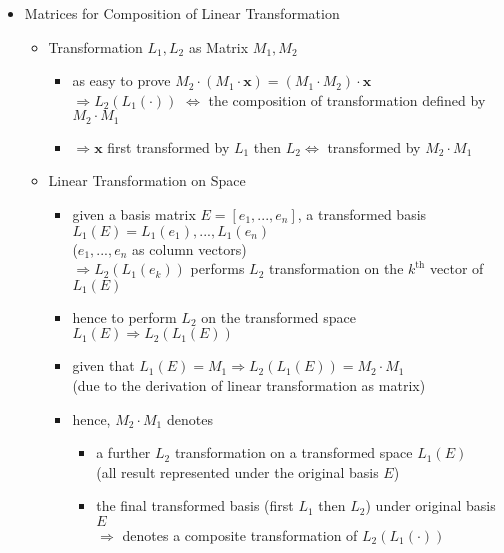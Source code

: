 \begin{itemize}
\item Matrices for Composition of Linear Transformation
	\begin{itemize}
	\item Transformation $L_1, L_2$ as Matrix $M_1, M_2$
		\begin{itemize}
		\item as easy to prove $M_2\cdot (M_1 \cdot \mathbf x) = (M_1\cdot M_2) \cdot \mathbf x$ \\
		$\Rightarrow L_2(L_1(\cdot))$ $\Leftrightarrow$ the composition of transformation defined by $M_2\cdot M_1$
		\item $\Rightarrow \mathbf x$ first transformed by $L_1$ then $L_2 \Leftrightarrow$ transformed by $M_2\cdot M_1$ 
		\end{itemize}
	\item Linear Transformation on Space
		\begin{itemize}
		\item given a basis matrix $E = [e_1,...,e_n]$, a transformed basis $L_1(E) = L_1(e_1), ..., L_1(e_n)$ \\
		($e_1,...,e_n$ as column vectors) \\
		$\Rightarrow L_2(L_1(e_k))$ performs $L_2$ transformation on the $k^\text{th}$ vector of $L_1(E)$
		\item hence to perform $L_2$ on the transformed space $L_1(E) \Rightarrow L_2(L_1(E))$
		\item given that $L_1(E) = M_1 \Rightarrow L_2(L_1(E)) = M_2 \cdot M_1$ \\ 
		(due to the derivation of linear transformation as matrix)
		\item hence, $M_2\cdot M_1$ denotes 
			\begin{itemize}
			\item a further $L_2$ transformation on a transformed space $L_1(E)$ \\
			(all result represented under the original basis $E$)
			\item the final transformed basis (first $L_1$ then $L_2$) under original basis $E$ \\
			$\Rightarrow$ denotes a composite transformation of $L_2(L_1(\cdot))$
			\end{itemize}
		

\end{itemize}
\end{itemize}
\end{itemize}
